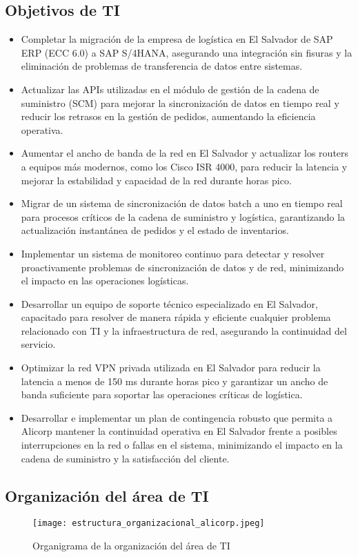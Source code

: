 \subsection{Objetivos de TI}
    \begin{itemize}
        \item Completar la migración de la empresa de logística en El Salvador de SAP ERP (ECC 6.0) a SAP S/4HANA, asegurando una integración sin fisuras y la eliminación de problemas de transferencia de datos entre sistemas. 
        \item Actualizar las APIs utilizadas en el módulo de gestión de la cadena de suministro (SCM) para mejorar la sincronización de datos en tiempo real y reducir los retrasos en la gestión de pedidos, aumentando la eficiencia operativa. 
        \item Aumentar el ancho de banda de la red en El Salvador y actualizar los routers a equipos más modernos, como los Cisco ISR 4000, para reducir la latencia y mejorar la estabilidad y capacidad de la red durante horas pico. 
        \item Migrar de un sistema de sincronización de datos batch a uno en tiempo real para procesos críticos de la cadena de suministro y logística, garantizando la actualización instantánea de pedidos y el estado de inventarios. 
        \item Implementar un sistema de monitoreo continuo para detectar y resolver proactivamente problemas de sincronización de datos y de red, minimizando el impacto en las operaciones logísticas. 
        \item Desarrollar un equipo de soporte técnico especializado en El Salvador, capacitado para resolver de manera rápida y eficiente cualquier problema relacionado con TI y la infraestructura de red, asegurando la continuidad del servicio. 
        \item Optimizar la red VPN privada utilizada en El Salvador para reducir la latencia a menos de 150 ms durante horas pico y garantizar un ancho de banda suficiente para soportar las operaciones críticas de logística. 
        \item Desarrollar e implementar un plan de contingencia robusto que permita a Alicorp mantener la continuidad operativa en El Salvador frente a posibles interrupciones en la red o fallas en el sistema, minimizando el impacto en la cadena de suministro y la satisfacción del cliente.
    \end{itemize}
\subsection{Organización del área de TI}
    \begin{figure}[!ht]
        \centering
        \texttt{[image: estructura\_organizacional\_alicorp.jpeg]}
        \caption{Organigrama  de la organización del área de TI}
    \end{figure}

